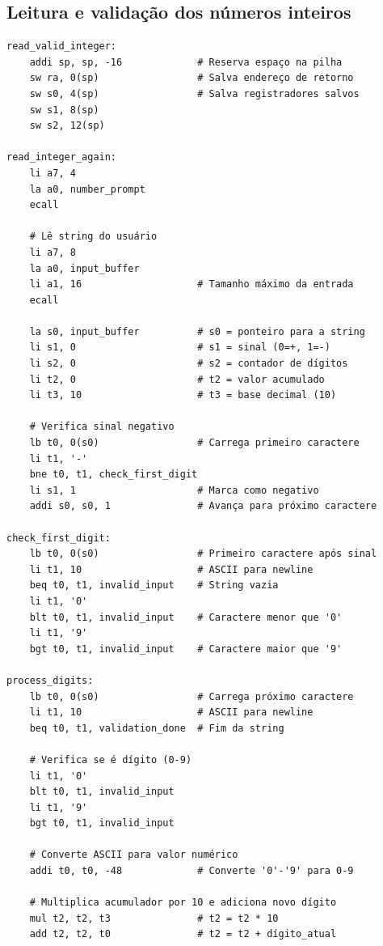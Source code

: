 \documentclass[12pt]{article}
\begin{document}
\subsection{Leitura e validação dos números inteiros}
\begin{lstlisting}[language={[x86masm]Assembler}, caption=Leitura e validação de números completos]
read_valid_integer:
    addi sp, sp, -16             # Reserva espaço na pilha
    sw ra, 0(sp)                 # Salva endereço de retorno
    sw s0, 4(sp)                 # Salva registradores salvos
    sw s1, 8(sp)
    sw s2, 12(sp)

read_integer_again:
    li a7, 4
    la a0, number_prompt
    ecall

    # Lê string do usuário
    li a7, 8
    la a0, input_buffer
    li a1, 16                    # Tamanho máximo da entrada
    ecall

    la s0, input_buffer          # s0 = ponteiro para a string
    li s1, 0                     # s1 = sinal (0=+, 1=-)
    li s2, 0                     # s2 = contador de dígitos
    li t2, 0                     # t2 = valor acumulado
    li t3, 10                    # t3 = base decimal (10)

    # Verifica sinal negativo
    lb t0, 0(s0)                 # Carrega primeiro caractere
    li t1, '-'
    bne t0, t1, check_first_digit
    li s1, 1                     # Marca como negativo
    addi s0, s0, 1               # Avança para próximo caractere

check_first_digit:
    lb t0, 0(s0)                 # Primeiro caractere após sinal
    li t1, 10                    # ASCII para newline
    beq t0, t1, invalid_input    # String vazia
    li t1, '0'
    blt t0, t1, invalid_input    # Caractere menor que '0'
    li t1, '9'
    bgt t0, t1, invalid_input    # Caractere maior que '9'

process_digits:
    lb t0, 0(s0)                 # Carrega próximo caractere
    li t1, 10                    # ASCII para newline
    beq t0, t1, validation_done  # Fim da string

    # Verifica se é dígito (0-9)
    li t1, '0'
    blt t0, t1, invalid_input
    li t1, '9'
    bgt t0, t1, invalid_input

    # Converte ASCII para valor numérico
    addi t0, t0, -48             # Converte '0'-'9' para 0-9

    # Multiplica acumulador por 10 e adiciona novo dígito
    mul t2, t2, t3               # t2 = t2 * 10
    add t2, t2, t0               # t2 = t2 + dígito_atual


\end{lstlisting}
\end{document}

